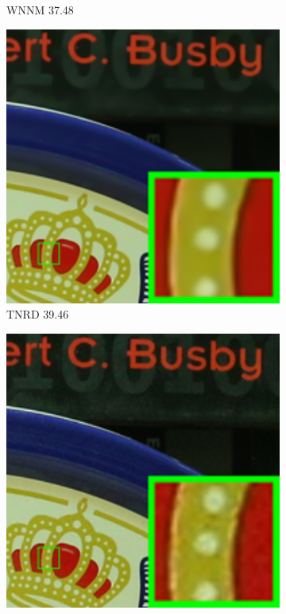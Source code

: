 \begin{figure}
\begin{subfigure}[t]{0.19\textwidth}
\caption{WNNM 37.48}
    \end{subfigure}
    \hfill
    \begin{subfigure}[t]{0.19\textwidth}
        \centering
        \includegraphics[width=1\textwidth]{images/twsc/cc/resize_br_TRD_5dmark3_iso3200_1_real.png}
\caption{TNRD 39.46}
    \end{subfigure}
    \hfill
    \begin{subfigure}[t]{0.19\textwidth}
        \centering
        \includegraphics[width=1\textwidth]{images/twsc/cc/resize_br_DnCNN_5dmark3_iso3200_1_real.png}

\end{subfigure}
\end{figure}

